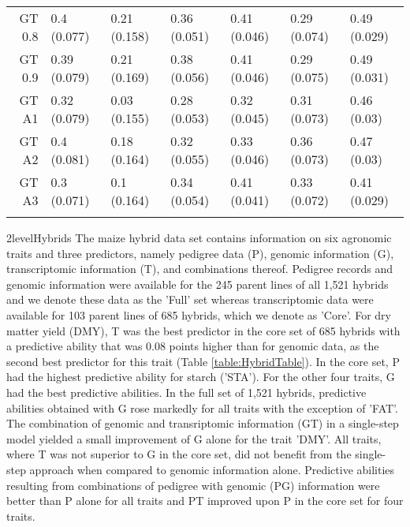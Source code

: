 \documentclass[12pt,titlepage]{article}
\begin{document}
\begin{table}[ht]
\begin{tabular}{rllllll}
  GT 0.8 & 0.4 (0.077) & 0.21 (0.158) & 0.36 (0.051) & 0.41 (0.046) & 0.29 (0.074) & 0.49 (0.029) \\ 
  GT 0.9 & 0.39 (0.079) & 0.21 (0.169) & 0.38 (0.056) & 0.41 (0.046) & 0.29 (0.075) & 0.49 (0.031) \\ 
  GT A1 & 0.32 (0.079) & 0.03 (0.155) & 0.28 (0.053) & 0.32 (0.045) & 0.31 (0.073) & 0.46 (0.03) \\ 
  GT A2 & 0.4 (0.081) & 0.18 (0.164) & 0.32 (0.055) & 0.33 (0.046) & 0.36 (0.073) & 0.47 (0.03) \\ 
  GT A3 & 0.3 (0.071) & 0.1 (0.164) & 0.34 (0.054) & 0.41 (0.041) & 0.33 (0.072) & 0.41 (0.029) \\ 
   \bottomrule
\multicolumn{6}{l}{}\\
\end{tabular}
\end{table}





\Genetics2level{Hybrids}
The maize hybrid data set contains information on six agronomic traits and
three predictors, namely pedigree data (P), genomic information (G), 
transcriptomic information (T), and combinations thereof.
Pedigree records and genomic information were available for the 245 parent 
lines of all 1,521 hybrids and we denote these data as the 'Full' set whereas
transcriptomic data were available for 103 parent lines of 685 hybrids, which
we denote as 'Core'.
For dry matter yield (DMY), T was the best predictor in the core set of 685 
hybrids with a predictive ability that was 0.08 points higher than for genomic 
data, as the second best predictor for this trait 
(Table \ref{table:HybridTable}).
In the core set, P had the highest predictive ability for starch ('STA').
For the other four traits, G had the best predictive abilities.
In the full set of 1,521 hybrids, predictive abilities obtained with G rose 
markedly for all traits with the exception of 'FAT'.
The combination of genomic and transriptomic information (GT) in a single-step
model yielded a small improvement of G alone for the trait 'DMY'.
All traits, where T was not superior to G in the core set, did not benefit from 
the single-step approach when compared to genomic information alone.
Predictive abilities resulting from combinations of pedigree with genomic (PG)
information were better than P alone for all traits and PT improved upon P in
the core set for four traits.
\end{document}
